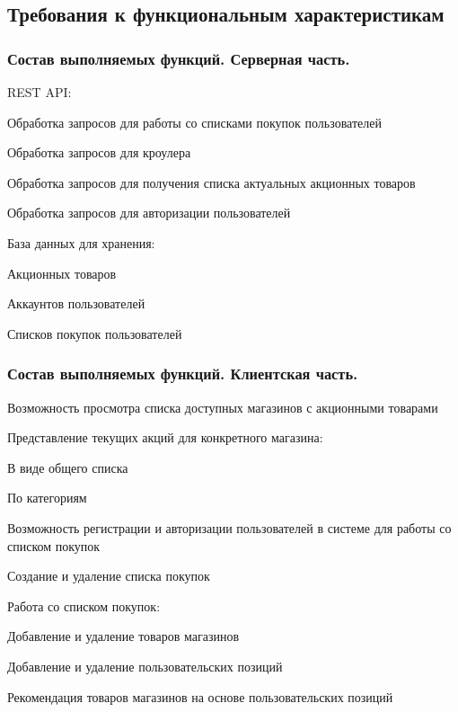 \subsection{Требования к функциональным характеристикам}
\subsubsection{Состав выполняемых функций. Серверная часть.}
\begin{my_enumerate}
  \item REST API:
    \begin{my_enumerate}
      \item Обработка запросов для работы со списками покупок пользователей
      \item Обработка запросов для кроулера
      \item Обработка запросов для получения списка актуальных акционных
        товаров
      \item Обработка запросов для авторизации пользователей
    \end{my_enumerate}
  \item База данных для хранения:
    \begin{my_enumerate}
      \item Акционных товаров
      \item Аккаунтов пользователей
      \item Списков покупок пользователей
    \end{my_enumerate}
\end{my_enumerate}

\subsubsection{Состав выполняемых функций. Клиентская часть.}
\begin{my_enumerate}
  \item Возможность просмотра списка доступных магазинов с акционными товарами
  \item Представление текущих акций для конкретного магазина:
    \begin{my_enumerate}
      \item В виде общего списка
      \item По категориям
    \end{my_enumerate}
  \item Возможность регистрации и авторизации пользователей в системе для
    работы со списком покупок
  \item Создание и удаление списка покупок
  \item Работа со списком покупок:
    \begin{my_enumerate}
      \item Добавление и удаление товаров магазинов
      \item Добавление и удаление пользовательских позиций
      \item Рекомендация товаров магазинов на основе пользовательских позиций 
    \end{my_enumerate}
\end{my_enumerate}


